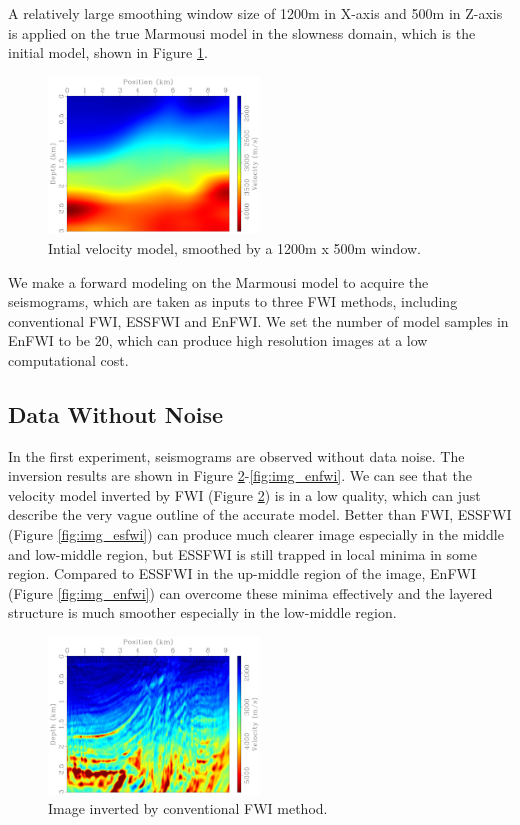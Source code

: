 \documentclass[mreferee]{gji}
\begin{document}
A relatively large smoothing window size of 1200m in X-axis and 500m in Z-axis is applied on the true Marmousi model in the slowness domain, which is the initial model, shown in Figure \ref{fig:smoothed_model}.

\begin{figure}
\center
\includegraphics[width=0.5\textwidth]{fig/marmvel_smoothed.pdf}
\caption{Intial velocity model, smoothed by a 1200m x 500m window.}
\label{fig:smoothed_model}
\end{figure}

We make a forward modeling on the Marmousi model to acquire the seismograms, which are taken as inputs to three FWI methods, including conventional FWI, ESSFWI and EnFWI. We set the number of model samples in EnFWI to be 20, which can produce high resolution images at a low computational cost.

\subsection{Data Without Noise}

In the first experiment, seismograms are observed without data noise. The inversion results are shown in Figure \ref{fig:img_fwi}-\ref{fig:img_enfwi}. We can see that the velocity model inverted by FWI (Figure \ref{fig:img_fwi}) is in a low quality, which can just describe the very vague outline of the accurate model. Better than FWI, ESSFWI (Figure \ref{fig:img_esfwi}) can produce much clearer image especially in the middle and low-middle region, but ESSFWI is still trapped in local minima in some region. Compared to ESSFWI in the up-middle region of the image, EnFWI (Figure \ref{fig:img_enfwi}) can overcome these minima effectively and the layered structure is much smoother especially in the low-middle region.

\begin{figure}
\center
\includegraphics[width=0.5\textwidth]{fig/fwi.pdf}
\caption{Image inverted by conventional FWI method.}
\label{fig:img_fwi}
\end{figure}
\end{document}
